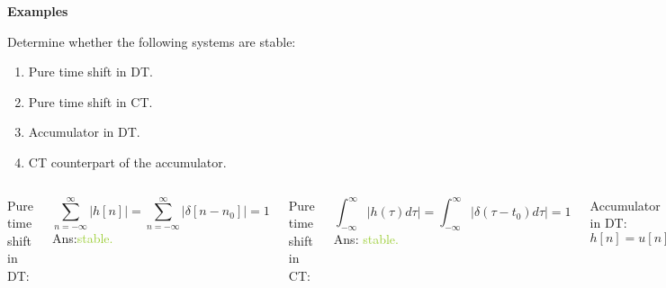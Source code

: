 \begin{frame}{}
    \textbf{ Examples}\par
    Determine whether the following systems are stable:
    \begin{enumerate}
        \item Pure time shift in DT.
        \item Pure time shift in CT.
        \item Accumulator in DT.
        \item CT counterpart of the accumulator.
    \end{enumerate}

    {
        \begin{columns}
            Pure time shift in DT:\par
            \begin{equation*}
                \sum_{n=-\infty}^{\infty}|h[n]| = \sum_{n=-\infty}^{\infty}|\delta[n-n_0]| = 1
            \end{equation*}
            \pause
            Ans:\textcolor{YellowGreen}{stable.}\par
            \pause
            Pure time shift in CT:\par
            \begin{equation*}
                \int_{-\infty}^{\infty}|h(\tau)d\tau| = \int_{-\infty}^{\infty}|\delta(\tau- t_0)d\tau| = 1
            \end{equation*}
            \pause
            Ans: \textcolor{YellowGreen}{stable.}\par
            Accumulator in DT: $h[n] = u[n]$\par
            \begin{equation*}
                \sum_{n=-\infty}^{\infty}|u[n]| = \sum_{n=0}^{\infty}|u[n]| = \infty
            \end{equation*}
            \pause
            Ans: \textcolor{Tomato}{unstable.}
            \pause

            CT counterpart of the accumulator:
            \begin{equation*}
                y(t) = \int_{-\infty}^{t}x(\tau)d\tau
            \end{equation*}
            The impulse response of the integrator can be found by letting $x(t) = \delta(t)$:
            \begin{equation*}
                h(t) = \int_{-\infty}^{t}\delta(\tau)d\tau = u(t).
            \end{equation*}
            \begin{equation*}
                \int_{-\infty}^{\infty}|u(\tau)d\tau| = \int_{0}^{\infty}d\tau| = \infty
            \end{equation*}
            \pause
            Ans: \textcolor{Tomato}{unstable.}
        \end{columns}
    }
\end{frame}




